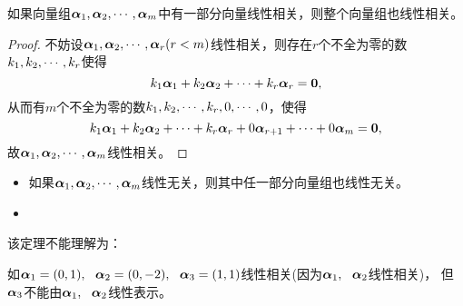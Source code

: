 \begin{frame}
\begin{li}
  如果向量组$\boldsymbol{\alpha}_1,\boldsymbol{\alpha}_2,\cdots,\boldsymbol{\alpha}_m$中有一部分向量线性相关，则整个向量组也线性相关。
\end{li}
\pause 
\begin{proof}
不妨设$\boldsymbol{\alpha}_1,\boldsymbol{\alpha}_2,\cdots,\boldsymbol{\alpha}_r(r<m)$线性相关，则存在$r$个不全为零的数$k_1,k_2,\cdots,k_r$使得
$$
k_1\alphabd_1+k_2\alphabd_2+\cd+k_r\alphabd_r=\M0,
$$
从而有$m$个不全为零的数$k_1,k_2,\cdots,k_r,0,\cdots,0$，使得
$$
k_1\alphabd_1+k_2\alphabd_2+\cd+k_r\alphabd_r+0\alphabd_{r+1}+\cd+0\alphabd_m=\M0,
$$
故$\boldsymbol{\alpha}_1,\boldsymbol{\alpha}_2,\cdots,\boldsymbol{\alpha}_m$线性相关。
\end{proof}
\end{frame}

\begin{frame}
\begin{zhu}
  \begin{itemize}
  \item 如果$\boldsymbol{\alpha}_1,\boldsymbol{\alpha}_2,\cdots,\boldsymbol{\alpha}_m$线性无关，则其中任一部分向量组也线性无关。              
  \item     {}
  \end{itemize}
  
\end{zhu}


\begin{zhu}
  该定理不能理解为：  

  如$\boldsymbol{\alpha}_1=(0,1), ~~\boldsymbol{\alpha}_2=(0,-2), ~~\boldsymbol{\alpha}_3=(1,1)$线性相关(因为$\boldsymbol{\alpha}_1,~~\boldsymbol{\alpha}_2$线性相关)，
  但$\boldsymbol{\alpha}_3$不能由$\boldsymbol{\alpha}_1,~~\boldsymbol{\alpha}_2$线性表示。 
\end{zhu}
\end{frame}

